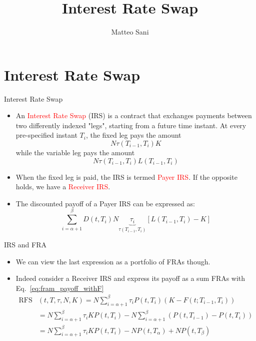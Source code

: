 \documentclass{beamer}
\title{Interest Rate Swap}
\author{Matteo Sani}
\begin{document}
	\begin{frame}[plain]
		\maketitle
	\end{frame}
	

\section{Interest Rate Swap}
\begin{frame}{Interest Rate Swap}
	\begin{itemize}
		\item An \textcolor{red}{Interest Rate Swap} (IRS) is a contract that exchanges payments between two differently indexed "legs", starting from a future time instant. At every pre-specified instant $T_i$, the fixed leg pays the amount
		\begin{equation*}
			N\tau(T_{i-1}, T_i)K
		\end{equation*}
		while the variable leg pays the amount
		\begin{equation*}
			N\tau(T_{i-1}, T_i)L(T_{i-1}, T_i)
		\end{equation*}
		\item When the fixed leg is paid, the IRS is termed \textcolor{red}{Payer IRS}. If the opposite holds, we have a \textcolor{red}{Receiver IRS}.
		\item The discounted payoff of a Payer IRS can be expressed as:
		\begin{equation}
			\sum_{i=\alpha+1}^{\beta} D(t,T_i)N \underbrace{\tau_i}_{\tau(T_{i-1},T_i)}
			\left[L(T_{i-1},T_i)-K\right]
		\end{equation}	
	\end{itemize}
	
\end{frame}

\begin{frame}{IRS and FRA}
	\begin{itemize}
		\item We can view the last expression as a portfolio of FRAs though.
		\item Indeed consider a Receiver IRS and express its payoff as a sum FRAs with Eq.~\ref{eq:fram_payoff_withF}
		\begin{equation}
			\begin{aligned}
				\text{RFS}&(t,T,\tau,N,K) =N\sum_{i=\alpha+1}^{\beta}\tau_i P(t,T_i)(K-F(t;T_{i-1},T_i))\\
				&=N\sum_{i=\alpha+1}^{\beta}\tau_i KP(t,T_i)-N\sum_{i=\alpha+1}^{\beta}(P(t,T_{i-1})-P(t,T_i)) \\
				&=N\sum_{i=\alpha+1}^{\beta}\tau_i KP(t,T_i)-NP(t,T_\alpha)+NP(t,T_\beta)
			\end{aligned}
		\end{equation}
	\end{itemize}
\end{frame}
\end{document}

